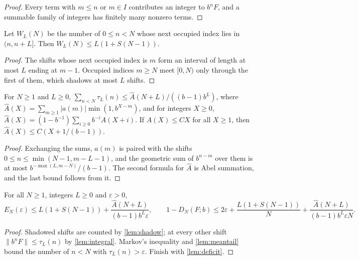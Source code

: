 \documentclass[11pt]{article}
\newcommand{\dist}[1]{\lVert #1\rVert}
\newcommand{\Ahat}{\widehat A}
\begin{document}
\begin{proof}
Every term with $m\le n$ or $m\in I$ contributes an integer to $b^nF$, and a summable
family of integers has finitely many nonzero terms.
\end{proof}

\begin{lemma}[Shadows]\label{lem:shadow}
Let $W_L(N)$ be the number of $0\le n<N$ whose next occupied index lies in $(n,n+L]$.
Then $W_L(N)\le L(1+S(N-1))$.
\end{lemma}

\begin{proof}
The shifts whose next occupied index is $m$ form an interval of length at most $L$ ending
at $m-1$. Occupied indices $m\ge N$ meet $[0,N)$ only through the first of them, which
shadows at most $L$ shifts.
\end{proof}

\begin{lemma}\label{lem:meantail}
For $N\ge1$ and $L\ge0$,
$\sum_{n<N}\tau_L(n)\le\Ahat(N+L)/((b-1)b^L)$, where
$\Ahat(X)=\sum_{m\ge1}|a(m)|\min(1,b^{X-m})$, and for integers $X\ge0$,
$\Ahat(X)=(1-b^{-1})\sum_{i\ge0}b^{-i}A(X+i)$. If $A(X)\le CX$ for all $X\ge1$, then $\Ahat(X)\le C(X+1/(b-1))$.
\end{lemma}

\begin{proof}
Exchanging the sums, $a(m)$ is paired with the shifts $0\le n\le\min(N-1,m-L-1)$, and the
geometric sum of $b^{n-m}$ over them is at most $b^{-\max(L,m-N)}/(b-1)$. The second
formula for $\Ahat$ is Abel summation, and the last bound follows from it.
\end{proof}

\begin{theorem}\label{thm:finitetransfer}
For all $N\ge1$, integers $L\ge0$ and $\varepsilon>0$,
\[
E_N(\varepsilon)\le L(1+S(N-1))+\frac{\Ahat(N+L)}{(b-1)b^L\varepsilon},\qquad
1-D_N(F;b)\le2\varepsilon+\frac{L(1+S(N-1))}N+\frac{\Ahat(N+L)}{(b-1)b^L\varepsilon N}.
\]
\end{theorem}

\begin{proof}
Shadowed shifts are counted by \cref{lem:shadow}; at every other shift
$\dist{b^nF}\le\tau_L(n)$ by \cref{lem:integral}. Markov's inequality and
\cref{lem:meantail} bound the number of $n<N$ with $\tau_L(n)>\varepsilon$. Finish with
\cref{lem:deficit}.
\end{proof}
\end{document}
